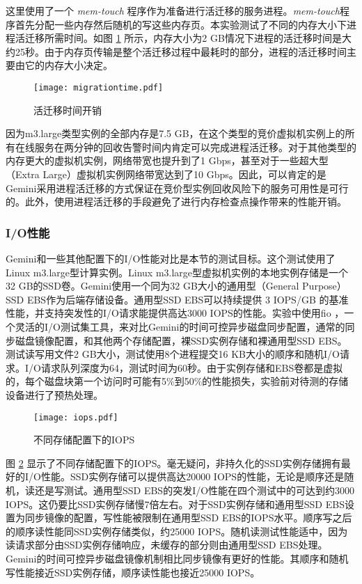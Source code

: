 这里使用了一个 \emph{mem-touch} 程序作为准备进行活迁移的服务进程。\emph{mem-touch}程序首先分配一些内存然后随机的写这些内存页。本实验测试了不同的内存大小下进程活迁移所需时间。如图 \ref{figure:migrationtime} 所示，内存大小为2 GB情况下进程的活迁移时间是大约25秒。由于内存页传输是整个活迁移过程中最耗时的部分，进程的活迁移时间主要由它的内存大小决定。
\begin{figure}
  \centering
  \texttt{[image: migrationtime.pdf]}
  \caption{活迁移时间开销}
  \label{figure:migrationtime}
\end{figure}

因为m3.large类型实例的全部内存是7.5 GB，在这个类型的竞价虚拟机实例上的所有在线服务在两分钟的回收告警时间内肯定可以完成进程活迁移。对于其他类型的内存更大的虚拟机实例，网络带宽也提升到了1 Gbps，甚至对于一些超大型（Extra Large）虚拟机实例网络带宽达到了10 Gbps。因此，可以肯定的是Gemini采用进程活迁移的方式保证在竞价型实例回收风险下的服务可用性是可行的。此外，使用进程活迁移的手段避免了进行内存检查点操作带来的性能开销。

\subsubsection{I/O性能}
Gemini和一些其他配置下的I/O性能对比是本节的测试目标。这个测试使用了Linux m3.large型计算实例。Linux m3.large型虚拟机实例的本地实例存储是一个32 GB的SSD卷。Gemini使用一个同为32 GB大小的通用型（General Purpose）SSD EBS作为后端存储设备。通用型SSD EBS可以持续提供 3 IOPS/GB 的基准性能，并支持突发性的I/O请求能提供高达3000 IOPS的性能。实验中使用fio \cite{FIO:2014}，一个灵活的I/O测试集工具，来对比Gemini的时间可控异步磁盘同步配置，通常的同步磁盘镜像配置，和其他两个存储配置，裸SSD实例存储和裸通用型SSD EBS。测试读写用文件2 GB大小，测试使用8个进程提交16 KB大小的顺序和随机I/O请求。I/O请求队列深度为64，测试时间为60秒。由于实例存储和EBS卷都是虚拟的，每个磁盘块第一个访问时可能有5\%到50\%的性能损失，实验前对待测的存储设备进行了预热处理。
\begin{figure}[]
  \centering
  \texttt{[image: iops.pdf]}
  \caption{不同存储配置下的IOPS}
  \label{figure:iops}
\end{figure}

图 \ref{figure:iops} 显示了不同存储配置下的IOPS。毫无疑问，非持久化的SSD实例存储拥有最好的I/O性能。SSD实例存储可以提供高达20000 IOPS的性能，无论是顺序还是随机，读还是写测试。通用型SSD EBS的突发I/O性能在四个测试中的可达到约3000 IOPS。这仍要比SSD实例存储慢7倍左右。对于SSD实例存储和通用型SSD EBS设置为同步镜像的配置，写性能被限制在通用型SSD EBS的IOPS水平。顺序写之后的顺序读性能同SSD实例存储类似，约25000 IOPS。随机读测试性能适中，因为读请求部分由SSD实例存储响应，未缓存的部分则由通用型SSD EBS处理。Gemini的时间可控异步磁盘镜像机制相比同步镜像有更好的性能。其顺序和随机写性能接近SSD实例存储，顺序读性能也接近25000 IOPS。

